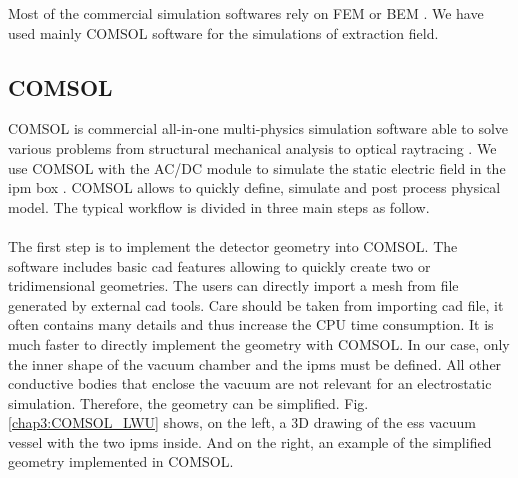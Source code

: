 \begin{refsection}
	Most of the commercial simulation softwares rely on FEM or BEM \cite{cststudio2018,ansys2018,couloumb2018}. We have used mainly COMSOL software for the simulations of extraction field.

	\subsection{COMSOL}
	COMSOL is commercial all-in-one multi-physics simulation software able to solve various problems from structural mechanical analysis to optical raytracing \cite{comsol2018}. We use COMSOL with the AC/DC module to simulate the static electric field in the \acrshort{ipm} box \cite{comsolacdc2018}. COMSOL allows to quickly define, simulate and post process physical model. The typical workflow is divided in three main steps as follow.

	\paragraph{}
	The first step is to implement the detector geometry into COMSOL. The software includes basic \acrshort{cad} features allowing to quickly create two or tridimensional geometries. The users can directly import a mesh from file generated by external \acrshort{cad} tools. Care should be taken from importing \acrshort{cad} file, it often contains many details and thus increase the CPU time consumption. It is much faster to directly implement the geometry with COMSOL.  In our case, only the inner shape of the vacuum chamber and the \acrshort{ipm}s must be defined. All other conductive bodies that enclose the vacuum are not relevant for an electrostatic simulation. Therefore, the geometry can be simplified. Fig. \ref{chap3:COMSOL_LWU} shows, on the left, a 3D drawing of the \acrshort{ess} vacuum vessel with the two \acrshort{ipm}s inside. And on the right, an example of the simplified geometry implemented in COMSOL.

	


\end{refsection}
